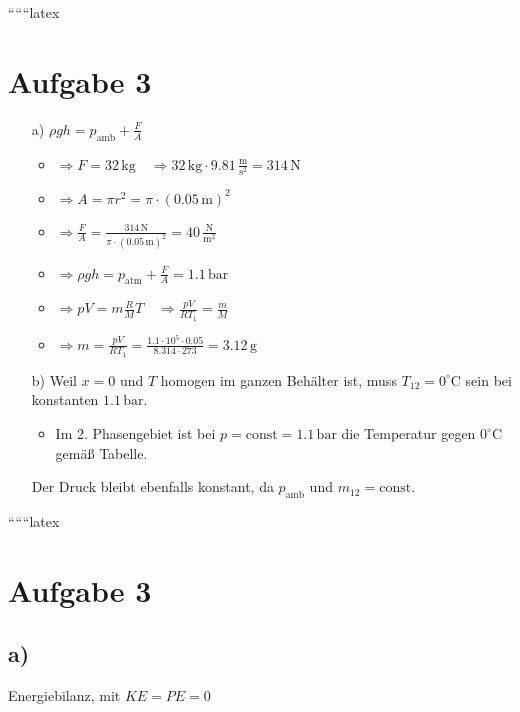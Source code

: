 
``````latex


\section*{Aufgabe 3}

\begin{itemize}
    \item[a)] \(\rho g h = p_{\text{amb}} + \frac{F}{A}\)
    \begin{itemize}
        \item \(\Rightarrow F = 32 \, \text{kg} \quad \Rightarrow 32 \, \text{kg} \cdot 9.81 \, \frac{\text{m}}{\text{s}^2} = 314 \, \text{N}\)
        \item \(\Rightarrow A = \pi r^2 = \pi \cdot (0.05 \, \text{m})^2\)
        \item \(\Rightarrow \frac{F}{A} = \frac{314 \, \text{N}}{\pi \cdot (0.05 \, \text{m})^2} = 40 \, \frac{\text{N}}{\text{m}^2}\)
        \item \(\Rightarrow \rho g h = p_{\text{atm}} + \frac{F}{A} = 1.1 \, \text{bar}\)
        \item \(\Rightarrow pV = m \frac{R}{M} T \quad \Rightarrow \frac{pV}{R T_1} = \frac{m}{M}\)
        \item \(\Rightarrow m = \frac{pV}{R T_1} = \frac{1.1 \cdot 10^5 \cdot 0.05}{8.314 \cdot 273} = 3.12 \, \text{g}\)
    \end{itemize}
    \item[b)] Weil \(x = 0\) und \(T\) homogen im ganzen Behälter ist, muss \(T_{12} = 0^\circ \text{C}\) sein bei konstanten \(1.1 \, \text{bar}\).
    \begin{itemize}
        \item Im 2. Phasengebiet ist bei \(p = \text{const} = 1.1 \, \text{bar}\) die Temperatur gegen \(0^\circ \text{C}\) gemäß Tabelle.
    \end{itemize}
    Der Druck bleibt ebenfalls konstant, da \(p_{\text{amb}}\) und \(m_{12} = \text{const}\).
\end{itemize}

``````latex


\section*{Aufgabe 3}

\subsection*{a)}
Energiebilanz, mit \( KE = PE = 0 \)

